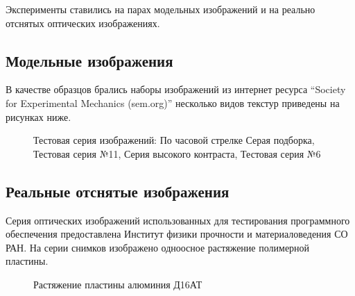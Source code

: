 Эксперименты ставились на парах модельных изображений и на реально отснятых оптических изображениях.

\subsection{Модельные изображения}

В качестве образцов брались наборы изображений из интернет ресурса ``Society for Experimental Mechanics (sem.org)'' несколько видов текстур приведены на рисунках ниже.

\begin{figure}[ht]
\caption{Тестовая серия изображений: По часовой стрелке Серая подборка, Тестовая серия №11, Серия высокого контраста, Тестовая серия №6}
\label{pic:gray_mix}
\end{figure}

\subsection{Реальные отснятые изображения}

Серия оптических изображений использованных для тестирования программного обеспечения предоставлена Институт физики прочности и материаловедения СО РАН. На серии снимков изображено одноосное растяжение полимерной пластины.

\begin{figure}[ht]
\caption{Растяжение пластины алюминия Д16АТ}
\label{pic:real_deform}
\end{figure}
